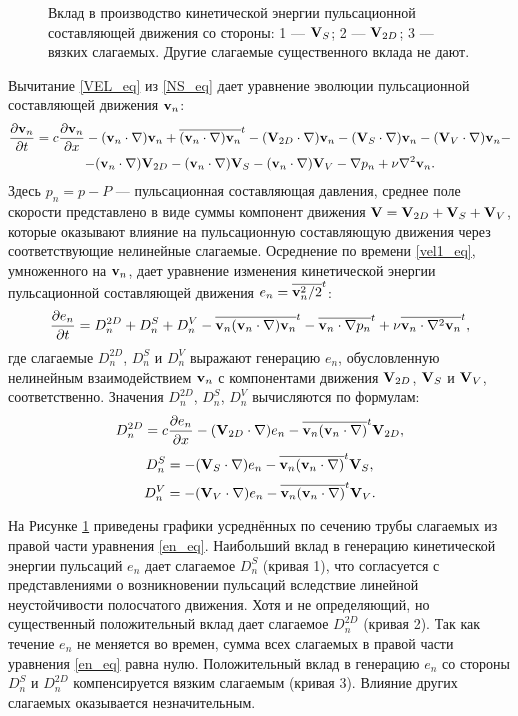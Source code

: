 \begin{figure}
\caption{Вклад в производство кинетической энергии пульсационной составляющей движения со стороны: 1 --- $\mathbf{V}_S$; 2 --- $\mathbf{V}_{2D}$; 3 --- вязких слагаемых. Другие слагаемые существенного вклада не дают.}
\label{e1_parts_pic}
\end{figure}

Вычитание \eqref{VEL_eq} из \eqref{NS_eq} дает уравнение эволюции пульсационной составляющей движения $\mathbf{v}_n$: 
\begin{multline} \label{vel1_eq}
\frac{\partial \mathbf{v}_n}{\partial t} = c \frac{\partial \mathbf{v}_n}{\partial x} - (\mathbf{v}_n \cdot \nabla) \mathbf{v}_n + \overline{(\mathbf{v}_n \cdot \nabla) \mathbf{v}_n}^t - (\mathbf{V}_{2D} \cdot \nabla) \mathbf{v}_n - (\mathbf{V}_S \cdot \nabla) \mathbf{v}_n - (\mathbf{V}_V \cdot \nabla) \mathbf{v}_n - \\ - (\mathbf{v}_n \cdot \nabla) \mathbf{V}_{2D} - (\mathbf{v}_n \cdot \nabla) \mathbf{V}_S - (\mathbf{v}_n \cdot \nabla) \mathbf{V}_V - \nabla p_n + \nu \nabla^2 \mathbf{v}_n. 
\end{multline}
Здесь $p_n = p - P$ --- пульсационная составляющая давления, среднее поле скорости представлено в виде суммы компонент движения $\mathbf{V} = \mathbf{V}_{2D} + \mathbf{V}_S + \mathbf{V}_V$, которые оказывают влияние на пульсационную составляющую движения через соответствующие нелинейные слагаемые. Осреднение по времени \eqref{vel1_eq}, умноженного на $\mathbf{v}_n$, дает уравнение изменения кинетической энергии пульсационной составляющей движения $e_n = \overline{\mathbf{v}_n^2/2}^t$: 
\begin{equation}\label{en_eq}
\frac{\partial e_n}{\partial t} = D_n^{2D} + D_n^{S} + D_n^{V} - \overline{\mathbf{v}_n (\mathbf{v}_n \cdot \nabla) \mathbf{v}_n}^t - \overline{\mathbf{v}_n \cdot \nabla p_n}^t + \nu \overline{\mathbf{v}_n \cdot \nabla^2 \mathbf{v}_n}^t,
\end{equation}
где слагаемые $D_n^{2D}$, $D_n^{S}$ и $D_n^{V}$ выражают генерацию $e_n$, обусловленную нелинейным взаимодействием $\mathbf{v}_n$ с компонентами движения $\mathbf{V}_{2D}$, $\mathbf{V}_S$ и $\mathbf{V}_V$, соответственно. Значения $D_n^{2D}$, $D_n^{S}$, $D_n^{V}$ вычисляются по формулам:
$$
D_n^{2D} = c \frac{\partial e_n}{\partial x}  - (\mathbf{V}_{2D} \cdot \nabla) e_n - \overline{\mathbf{v}_n (\mathbf{v}_n \cdot \nabla) }^t \mathbf{V}_{2D},
$$
$$
D_n^{S}  = - (\mathbf{V}_S \cdot \nabla) e_n - \overline{\mathbf{v}_n (\mathbf{v}_n \cdot \nabla)}^t \mathbf{V}_S,
$$
$$
D_n^{V} =  - (\mathbf{V}_V \cdot \nabla) e_n - \overline{\mathbf{v}_n (\mathbf{v}_n \cdot \nabla)}^t \mathbf{V}_V.
$$

На Рисунке \ref{e1_parts_pic} приведены графики усреднённых по сечению трубы слагаемых из правой части уравнения \eqref{en_eq}. Наибольший вклад в генерацию кинетической энергии пульсаций $e_n$ дает слагаемое $D_n^S$ (кривая 1), что согласуется с представлениями о возникновении пульсаций вследствие линейной неустойчивости полосчатого движения. Хотя и не определяющий, но существенный положительный вклад дает слагаемое $D_n^{2D}$ (кривая 2). Так как течение $e_n$ не меняется во времен, сумма всех слагаемых в правой части уравнения \eqref{en_eq} равна нулю. Положительный вклад в генерацию $e_n$ со стороны $D_n^S$ и $D_n^{2D}$ компенсируется вязким слагаемым (кривая 3). Влияние других слагаемых оказывается незначительным. 

